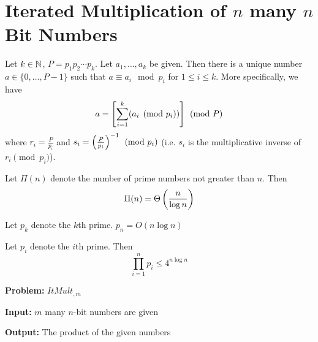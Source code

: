 \section{Iterated Multiplication of $n$ many $n$ Bit Numbers}

\begin{theorem}\label{crt}
	Let $k\in \mathbb{N}$, $P=p_1p_2\cdots p_k$. Let $a_1,\dots, a_k$ be given. Then there is a unique number $a\in \{0,\dots, P-1\}$ such that $a\equiv a_i\mod{p_i}$ for $1\leq i\leq k$. More specifically, we have $$a=\left[ \sum_{i=1}^k (a_i\pmod{p_i}) \right]\pmod{P}$$where $r_i=\frac{P}{p_i}$ and $s_i=\left(\frac{P}{p_i}\right)^{-1} \pmod{p_i}$ (i.e. $s_i$ is the multiplicative inverse of $r_i\pmod{p_i}$).
\end{theorem}
\begin{theorem}
	Let $\Pi(n)$ denote the number of prime numbers not greater than $n$. Then $$\Pi(n)=\Theta\left( \frac{n}{\log n}\right)$$
\end{theorem}
\begin{corollary}\label{approxpn}
	Let $p_k$ denote the $k$th prime. $p_n=O(n\log n)$
\end{corollary}
\begin{theorem}
	Let $p_i$ denote the $i$th prime. Then $$\prod_{i=1}^n p_i\leq 4^{n\log n}$$
\end{theorem}
\parinf
\textbf{Problem:} $ItMult_{,m}$

\textbf{Input:} $m$ many $n$-bit numbers are given

\textbf{Output:} The product of the given numbers

\parinn

